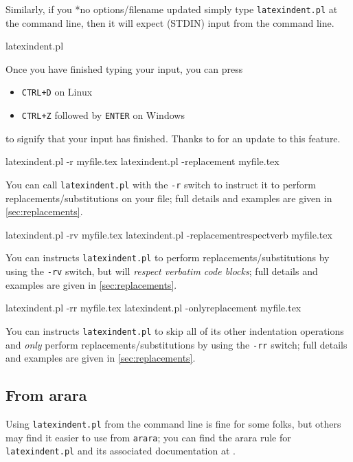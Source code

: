 	Similarly, if you%
	*{no options/filename updated} simply type
	\texttt{latexindent.pl} at the command line, then it will expect (STDIN) input from the
	command line.
	\begin{commandshell}
latexindent.pl
      \end{commandshell}

	Once you have finished typing your input, you can press
	\begin{itemize}
		\item \texttt{CTRL+D} on Linux
		\item \texttt{CTRL+Z} followed by \texttt{ENTER} on Windows
	\end{itemize}
	to signify that your input has finished. Thanks to \cite{xu-cheng} for an update
	to this feature.
	\begin{commandshell}
latexindent.pl -r myfile.tex
latexindent.pl -replacement myfile.tex
      \end{commandshell}
	You can%
	 call
	\texttt{latexindent.pl} with the \texttt{-r} switch to instruct it to perform
	replacements/substitutions on your file; full details and examples are given in
	\vref{sec:replacements}.

	\begin{commandshell}
latexindent.pl -rv myfile.tex
latexindent.pl -replacementrespectverb myfile.tex
      \end{commandshell}
	You can%
	 instructs
	\texttt{latexindent.pl} to perform replacements/substitutions by using the
    \texttt{-rv} switch, but will \emph{respect verbatim code blocks}; full details and examples are given in
	\vref{sec:replacements}.

	\begin{commandshell}
latexindent.pl -rr myfile.tex
latexindent.pl -onlyreplacement myfile.tex
      \end{commandshell}
	You can%
	 instructs
	\texttt{latexindent.pl} to skip all of its other indentation operations and
	\emph{only} perform replacements/substitutions by using the
	\texttt{-rr} switch; full details and examples are given in
	\vref{sec:replacements}.

\subsection{From arara}\label{sec:arara}
	Using \texttt{latexindent.pl} from the command line is fine for some folks, but others
	may find it easier to use from \texttt{arara}; you can find the arara rule for
	\texttt{latexindent.pl} and its associated documentation at \cite{paulo}.
